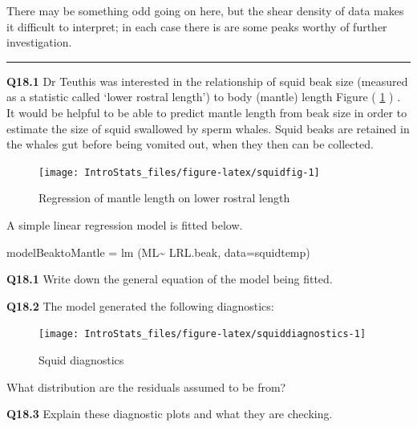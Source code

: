 \documentclass[
  oneside]{krantz}
\newenvironment{Shaded}{\begin{snugshade}}{\end{snugshade}}
\newcommand{\AttributeTok}[1]{\textcolor[rgb]{0.77,0.63,0.00}{#1}}
\newcommand{\FunctionTok}[1]{\textcolor[rgb]{0.00,0.00,0.00}{#1}}
\newcommand{\NormalTok}[1]{#1}
\newcommand{\OtherTok}[1]{\textcolor[rgb]{0.56,0.35,0.01}{#1}}
\newcommand{\SpecialCharTok}[1]{\textcolor[rgb]{0.00,0.00,0.00}{#1}}
\begin{document}
There may be something odd going on here, but the shear density of data makes it difficult to interpret; in each case there is are some peaks worthy of further investigation.

\begin{center}\rule{0.5\linewidth}{0.5pt}\end{center}

\textbf{Q18.1} Dr Teuthis was interested in the relationship of squid beak size (measured as a statistic called `lower rostral length') to body (mantle) length Figure ( \ref{fig:squidfig} ) . It would be helpful to be able to predict mantle length from beak size in order to estimate the size of squid swallowed by sperm whales. Squid beaks are retained in the whales gut before being vomited out, when they then can be collected.

\begin{figure}

{\centering \texttt{[image: IntroStats\_files/figure-latex/squidfig-1]} 

}

\caption{Regression of mantle length on lower rostral length}\label{fig:squidfig}
\end{figure}

A simple linear regression model is fitted below.

\begin{Shaded}
\begin{Highlighting}[]
\NormalTok{modelBeaktoMantle }\OtherTok{=}  \FunctionTok{lm}\NormalTok{ (ML}\SpecialCharTok{\textasciitilde{}}\NormalTok{ LRL.beak, }\AttributeTok{data=}\NormalTok{squidtemp)}
\end{Highlighting}
\end{Shaded}

\textbf{Q18.1} Write down the general equation of the model being fitted.

\textbf{Q18.2} The model generated the following diagnostics:

\begin{figure}

{\centering \texttt{[image: IntroStats\_files/figure-latex/squiddiagnostics-1]} 

}

\caption{Squid diagnostics}\label{fig:squiddiagnostics}
\end{figure}

What distribution are the residuals assumed to be from?

\textbf{Q18.3} Explain these diagnostic plots and what they are checking.
\end{document}

